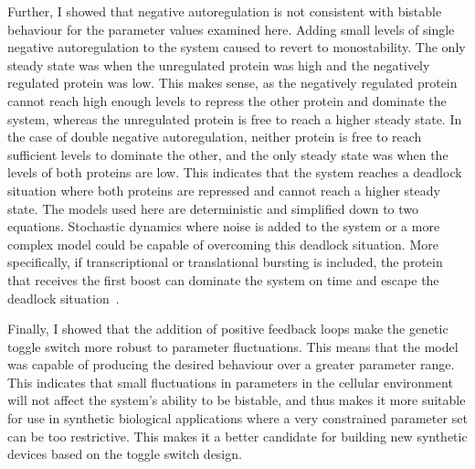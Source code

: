 Further, I showed that negative autoregulation is not consistent with bistable behaviour for the parameter values examined here. Adding small levels of single negative autoregulation to the system caused to revert to monostability. The only steady state was when the unregulated protein was high and the negatively regulated protein was low. This makes sense, as the negatively regulated protein cannot reach high enough levels to repress the other protein and dominate the system, whereas the unregulated protein is free to reach a higher steady state. In the case of double negative autoregulation, neither protein is free to reach sufficient levels to dominate the other, and the only steady state was when the levels of both proteins are low. This indicates that the system reaches a deadlock situation where both proteins are repressed and cannot reach a higher steady state. The models used here are deterministic and simplified down to two equations. Stochastic dynamics where noise is added to the system or a more complex model could be capable of overcoming this deadlock situation. More specifically, if transcriptional or translational bursting is included, the protein that receives the first boost can dominate the system on time and escape the deadlock situation~\autocite{Strasser:2012kt}.


Finally, I showed that the addition of positive feedback loops make the genetic toggle switch more robust to parameter fluctuations. This means that the model was capable of producing the desired behaviour over a greater parameter range. This indicates that small fluctuations in parameters in the cellular environment will not affect the system's ability to be bistable, and thus makes it more suitable for use in synthetic biological applications where a very constrained parameter set can be too restrictive. This makes it a better candidate for building new synthetic devices based on the toggle switch design.
 




